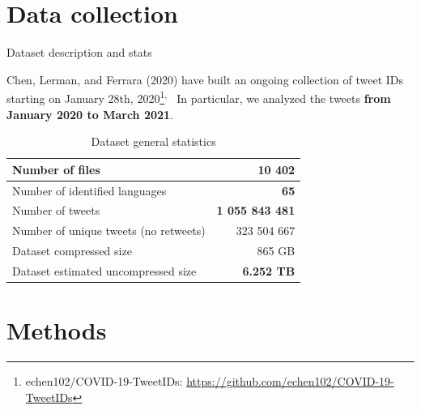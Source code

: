 \documentclass[9pt,aspectratio=1610]{beamer}  %
\begin{document}
\section{Data collection}

\begin{frame}{Dataset description and stats}

	Chen, Lerman, and Ferrara (2020) have built an ongoing collection of tweet IDs starting on January 28th, 2020\footnote{echen102/COVID-19-TweetIDs: \url{https://github.com/echen102/COVID-19-TweetIDs}}\textsuperscript{,}~\autocite{chen2020tracking} In particular, we analyzed the tweets \textbf{from January 2020 to March 2021}.
	
	\begin{table}[H]
        \centering
        \begin{tabular}{lr}
            Number of files & 10 402
            \\
            \midrule
            Number of identified languages & \textbf{65}
            \\
            \midrule
            Number of tweets & \textbf{1 055 843 481}
            \\
            \midrule
            Number of unique tweets (no retweets) & 323 504 667
            \\
            \midrule
            Dataset compressed size & 865 GB
            \\
            \midrule
            Dataset estimated uncompressed size & \textbf{6.252 TB}
        \end{tabular}
        \caption{Dataset general statistics}
        \label{tab:dataset-stats}
    \end{table}

\end{frame}

\section{Methods}
\end{document}
